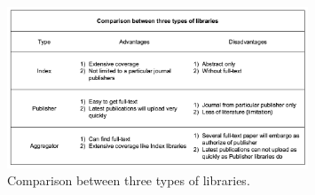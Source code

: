 \begin{figure}[htb]
	\begin{center}
		\includegraphics[width=0.8\textwidth]{Wolverine_Background_Chart_1}
	\end{center}
	\caption{Comparison between three types of libraries.\label{WBC1}}
\end{figure}
\newpage

